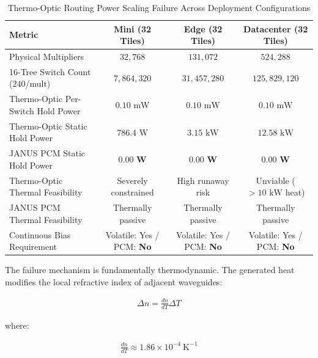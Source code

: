 \documentclass[journal]{IEEEtran}
\begin{document}
\begin{table}[htbp]
\centering
\caption{
Thermo-Optic Routing Power Scaling Failure Across Deployment Configurations
}
\label{tab:mzi_failure}
\begin{tabular}{lccc}
\toprule

\textbf{Metric} & \textbf{Mini (32 Tiles)} & \textbf{Edge (32 Tiles)} & \textbf{Datacenter (32 Tiles)} \\
\midrule

Physical Multipliers & $32{,}768$ & $131{,}072$ & $524{,}288$ \\

16-Tree Switch Count ($240$/mult) & $7{,}864{,}320$ & $31{,}457{,}280$ & $125{,}829{,}120$ \\

Thermo-Optic Per-Switch Hold Power & $0.10\text{ mW}$ & $0.10\text{ mW}$ & $0.10\text{ mW}$ \\

Thermo-Optic Static Hold Power & $786.4\text{ W}$ & $3.15\text{ kW}$ & $12.58\text{ kW}$ \\

JANUS PCM Static Hold Power & $\mathbf{0.00\text{ W}}$ & $\mathbf{0.00\text{ W}}$ & $\mathbf{0.00\text{ W}}$ \\

Thermo-Optic Thermal Feasibility & Severely constrained & High runaway risk & Unviable ($>10\text{ kW}$ heat) \\

JANUS PCM Thermal Feasibility & Thermally passive & Thermally passive & Thermally passive \\

Continuous Bias Requirement & Volatile: Yes / PCM: \textbf{No} & Volatile: Yes / PCM: \textbf{No} & Volatile: Yes / PCM: \textbf{No} \\

\bottomrule
\end{tabular}
\end{table}

The failure mechanism is fundamentally thermodynamic. The generated heat modifies the local refractive index of adjacent waveguides:

\begin{align}
\Delta n = \frac{dn}{dT} \Delta T
\label{eq:thermal_index}
\end{align}

where:

\begin{align}
\frac{dn}{dT} \approx 1.86 \times 10^{-4}~\mathrm{K}^{-1}
\end{align}
\end{document}
